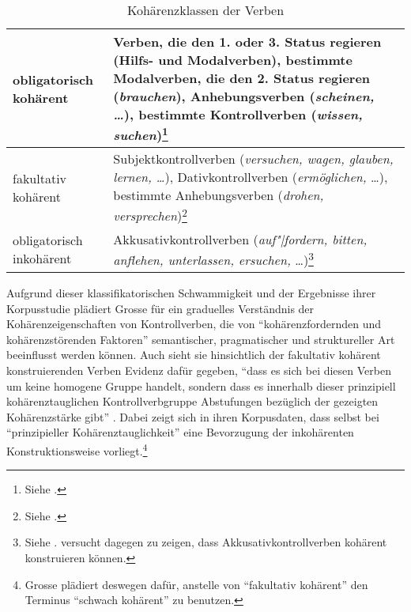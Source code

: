 \begin{table}[ht]
\begin{center}

\begin{tabular}{p{2.3cm}|p{8cm}}
obligatorisch koh\"arent & Verben, die den 1. oder 3. Status regieren (Hilfs- und Modalverben), bestimmte Modalverben, die den 2. Status regieren ({\it brauchen}), Anhebungsverben ({\it scheinen, \ldots}), bestimmte Kontrollverben ({\it wissen, suchen})\footnote{Siehe \cite{Reis:01}.}\\
\hline
fakultativ \mbox{kohärent} & Subjektkontrollverben ({\it versuchen, wagen, glauben, lernen, \ldots}), Dativkontrollverben ({\it ermöglichen,} \ldots), bestimmte Anhebungsverben ({\it drohen, versprechen})\footnote{Siehe \cite{Reis:05}.} \\
\hline
obligatorisch inkohärent & Akkusativkontrollverben ({\it auf"|fordern, bitten, anflehen, unterlassen, ersuchen,} \ldots)\footnote{Siehe \citet[55]{Grosse:05}. \citet[2.1.7]{Mueller:02} versucht dagegen zu zeigen, dass Akkusativkontrollverben kohärent konstruieren können.} \\
\end{tabular}

\end{center}
\caption{Kohärenzklassen der Verben\label{fig-kohaerenzklassen}}
\end{table}


Aufgrund dieser klassifikatorischen Schwammigkeit und der Ergebnisse ihrer Korpusstudie plädiert Grosse für ein graduelles Verständnis der Kohärenzeigenschaften von Kontrollverben, die von "`kohärenzfordernden und kohärenzstörenden Faktoren"' semantischer, pragmatischer und struktureller Art beeinflusst werden können. Auch sieht sie hinsichtlich der fakultativ kohärent konstruierenden Verben Evidenz dafür gegeben, "`dass es sich bei diesen Verben um keine homogene Gruppe handelt, sondern dass es innerhalb dieser prinzipiell kohärenztauglichen Kontrollverbgruppe Abstufungen bezüglich der gezeigten Kohärenzstärke gibt"' \cite[11]{Grosse:05}. Dabei zeigt sich in ihren Korpusdaten, dass selbst bei "`prinzipieller Kohärenztauglichkeit"' eine Bevorzugung der  inkohärenten Konstruktionsweise vorliegt.\footnote{Grosse plädiert deswegen dafür, anstelle von "`fakultativ kohärent"' den Terminus "`schwach kohärent"' zu benutzen.} 

